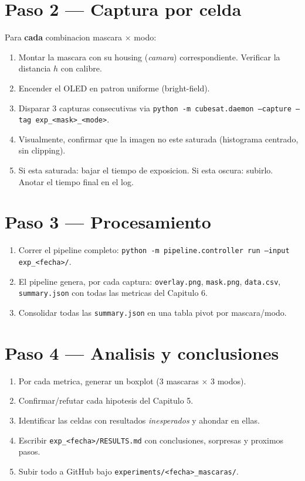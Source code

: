 \documentclass[11pt,a4paper,oneside]{report}
\begin{document}
\section{Paso 2 --- Captura por celda}

Para \textbf{cada} combinacion mascara $\times$ modo:

\begin{enumerate}[leftmargin=2.2em]
  \item Montar la mascara con su housing (\emph{camara}) correspondiente.
        Verificar la distancia $h$ con calibre.
  \item Encender el OLED en patron uniforme (bright-field).
  \item Disparar 3 capturas consecutivas via
        \texttt{python -m cubesat.daemon --capture --tag exp\_<mask>\_<mode>}.
  \item Visualmente, confirmar que la imagen no este saturada
        (histograma centrado, sin clipping).
  \item Si esta saturada: bajar el tiempo de exposicion. Si esta oscura: subirlo.
        Anotar el tiempo final en el log.
\end{enumerate}

\section{Paso 3 --- Procesamiento}

\begin{enumerate}[leftmargin=2.2em]
  \item Correr el pipeline completo:
        \texttt{python -m pipeline.controller run --input exp\_<fecha>/}.
  \item El pipeline genera, por cada captura:
        \texttt{overlay.png}, \texttt{mask.png}, \texttt{data.csv},
        \texttt{summary.json} con todas las metricas del Capitulo 6.
  \item Consolidar todas las \texttt{summary.json} en una tabla pivot por mascara/modo.
\end{enumerate}

\section{Paso 4 --- Analisis y conclusiones}

\begin{enumerate}[leftmargin=2.2em]
  \item Por cada metrica, generar un boxplot (3 mascaras $\times$ 3 modos).
  \item Confirmar/refutar cada hipotesis del Capitulo 5.
  \item Identificar las celdas con resultados \emph{inesperados} y ahondar en ellas.
  \item Escribir \texttt{exp\_<fecha>/RESULTS.md} con conclusiones, sorpresas y
        proximos pasos.
  \item Subir todo a GitHub bajo \texttt{experiments/<fecha>\_mascaras/}.
\end{enumerate}
\end{document}

